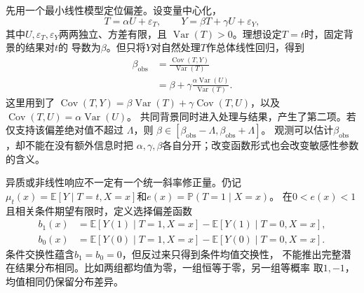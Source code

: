 先用一个最小线性模型定位偏差。设变量中心化，
\[
  T=\alpha U+\varepsilon_T,\qquad
  Y=\beta T+\gamma U+\varepsilon_Y,
\]
其中\(U,\varepsilon_T,\varepsilon_Y\)两两独立、方差有限，且
\(\operatorname{Var}(T)>0\)。理想设定\(T=t\)时，固定背景的结果对\(t\)的
导数为\(\beta\)。但只将\(Y\)对自然处理\(T\)作总体线性回归，得到
\begin{equation}
  \begin{aligned}
    \beta_{\mathrm{obs}}
    &=\frac{\operatorname{Cov}(T,Y)}{\operatorname{Var}(T)}\\
    &=\beta+
      \gamma\frac{\alpha\operatorname{Var}(U)}{\operatorname{Var}(T)}.
  \end{aligned}
  \label{eq:causal-linear-confounding-bias}
\end{equation}
这里用到了
\(\operatorname{Cov}(T,Y)=\beta\operatorname{Var}(T)
+\gamma\operatorname{Cov}(T,U)\)，以及
\(\operatorname{Cov}(T,U)=\alpha\operatorname{Var}(U)\)。
共同背景同时进入处理与结果，产生了第二项。若仅支持该偏差绝对值不超过
\(\Lambda\)，则
\(\beta\in[\beta_{\mathrm{obs}}-\Lambda,\beta_{\mathrm{obs}}+\Lambda]\)。
观测可以估计\(\beta_{\mathrm{obs}}\)，却不能在没有额外信息时把
\(\alpha,\gamma,\beta\)各自分开；改变函数形式也会改变敏感性参数的含义。

异质或非线性响应不一定有一个统一斜率修正量。仍记
\(\mu_t(x)=\mathbb E[Y\mid T=t,X=x]\)和\(e(x)=\mathbb P(T=1\mid X=x)\)。
在\(0<e(x)<1\)且相关条件期望有限时，定义选择偏差函数
\[
  \begin{aligned}
    b_1(x)&=\mathbb E[Y(1)\mid T=1,X=x]
            -\mathbb E[Y(1)\mid T=0,X=x],\\
    b_0(x)&=\mathbb E[Y(0)\mid T=1,X=x]
            -\mathbb E[Y(0)\mid T=0,X=x].
  \end{aligned}
\]
条件交换性蕴含\(b_1=b_0=0\)，但反过来只得到条件均值交换性，
不能推出完整潜在结果分布相同。比如两组都均值为零，一组恒等于零，另一组等概率
取\(1,-1\)，均值相同仍保留分布差异。

